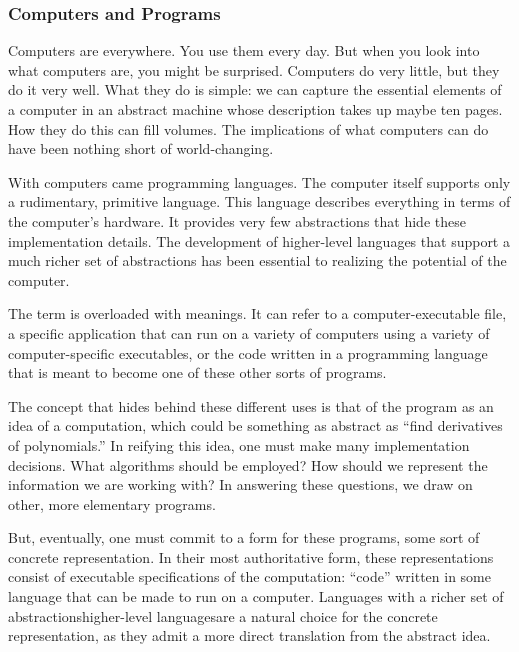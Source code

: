 \label{introduction:introduction}
\subsubsection*{Computers and Programs}
Computers are everywhere. You use them every day. But when you look into what computers are, you might be surprised. Computers do very little, but they do it very well. What they do is simple: we can capture the essential elements of a computer in an abstract machine whose description takes up maybe ten pages. How they do this can fill volumes. The implications of what computers can do have been nothing short of world-changing.

With computers came programming languages. The computer itself supports only a rudimentary, primitive language. This language describes everything in terms of the computer's hardware. It provides very few abstractions that hide these implementation details. The development of higher-level languages that support a much richer set of abstractions has been essential to realizing the potential of the computer.

The term  is overloaded with meanings. It can refer to a computer-executable file, a specific application that can run on a variety of computers using a variety of computer-specific executables, or the code written in a programming language that is meant to become one of these other sorts of programs.

The concept that hides behind these different uses is that of the program as an idea of a computation, which could be something as abstract as ``find derivatives of polynomials.'' In reifying this idea, one must make many implementation decisions. What algorithms should be employed? How should we represent the information we are working with? In answering these questions, we draw on other, more elementary programs.

But, eventually, one must commit to a form for these programs, some sort of concrete representation. In their most authoritative form, these representations consist of executable specifications of the computation: ``code'' written in some language that can be made to run on a computer. Languages with a richer set of abstractions\empause higher-level languages\empause are a natural choice for the concrete representation, as they admit a more direct translation from the abstract idea.

